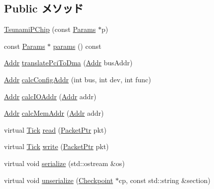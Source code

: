\subsection*{Public メソッド}
\begin{DoxyCompactItemize}
\item 
\hyperlink{classTsunamiPChip_a2b23bec87373536aec1deca8d2646a87}{TsunamiPChip} (const \hyperlink{classTsunamiPChip_ad83d95a5c11dc8215f058bbac3c02dd6}{Params} $\ast$p)
\item 
const \hyperlink{classTsunamiPChip_ad83d95a5c11dc8215f058bbac3c02dd6}{Params} $\ast$ \hyperlink{classTsunamiPChip_acd3c3feb78ae7a8f88fe0f110a718dff}{params} () const 
\item 
\hyperlink{base_2types_8hh_af1bb03d6a4ee096394a6749f0a169232}{Addr} \hyperlink{classTsunamiPChip_a5de3f8c8c47bf4bb58e072f54f4a7cba}{translatePciToDma} (\hyperlink{base_2types_8hh_af1bb03d6a4ee096394a6749f0a169232}{Addr} busAddr)
\item 
\hyperlink{base_2types_8hh_af1bb03d6a4ee096394a6749f0a169232}{Addr} \hyperlink{classTsunamiPChip_ac58937201c28a74230a03b39b03066b6}{calcConfigAddr} (int bus, int dev, int func)
\item 
\hyperlink{base_2types_8hh_af1bb03d6a4ee096394a6749f0a169232}{Addr} \hyperlink{classTsunamiPChip_a6c236382792e59da5c56c9d7c01de500}{calcIOAddr} (\hyperlink{base_2types_8hh_af1bb03d6a4ee096394a6749f0a169232}{Addr} addr)
\item 
\hyperlink{base_2types_8hh_af1bb03d6a4ee096394a6749f0a169232}{Addr} \hyperlink{classTsunamiPChip_a0501fb8a3bd69d670b9b92d2f7991ad2}{calcMemAddr} (\hyperlink{base_2types_8hh_af1bb03d6a4ee096394a6749f0a169232}{Addr} addr)
\item 
virtual \hyperlink{base_2types_8hh_a5c8ed81b7d238c9083e1037ba6d61643}{Tick} \hyperlink{classTsunamiPChip_a613ec7d5e1ec64f8d21fec78ae8e568e}{read} (\hyperlink{classPacket}{PacketPtr} pkt)
\item 
virtual \hyperlink{base_2types_8hh_a5c8ed81b7d238c9083e1037ba6d61643}{Tick} \hyperlink{classTsunamiPChip_a4cefab464e72b5dd42c003a0a4341802}{write} (\hyperlink{classPacket}{PacketPtr} pkt)
\item 
virtual void \hyperlink{classTsunamiPChip_a53e036786d17361be4c7320d39c99b84}{serialize} (std::ostream \&os)
\item 
virtual void \hyperlink{classTsunamiPChip_af22e5d6d660b97db37003ac61ac4ee49}{unserialize} (\hyperlink{classCheckpoint}{Checkpoint} $\ast$cp, const std::string \&section)
\end{DoxyCompactItemize}
